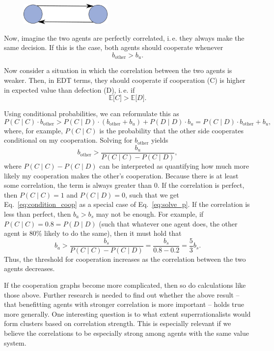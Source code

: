 \begin{figure}
    \centering
    \includegraphics[width=1.78in]{figs/mutual-cooperation-graph}
\end{figure}

Now, imagine the two agents are perfectly correlated, i.\,e. they always
make the same decision. If this is the case, both agents should
cooperate whenever
\begin{equation}
    b_{\text{other}} > b_{u}.
    \label{eq:condition_coop}
\end{equation}

Now consider a situation in which the correlation between the two agents
is weaker. Then, in EDT terms, they should cooperate if cooperation (C)
is higher in expected value than defection (D), i.\,e. if
$$
\mathbb{E}\lbrack C\rbrack > \mathbb{E}\lbrack D\rbrack.
$$

Using conditional probabilities, we can reformulate this as
$$
P(C\mid C) \cdot b_{\text{other}} > P(C\mid D) \cdot (b_{\text{other}} + b_{u}) + P(D\mid D) \cdot b_{u} =
P(C\mid D) \cdot b_{\text{other}} + b_{u},
$$
where, for example, \(P(C\mid C)\) is the probability that the other side
cooperates conditional on my cooperation. Solving for \(b_{\text{other}}\) yields
\begin{equation}
    b_{\text{other}} > \frac{b_{u}}{P(C\mid C) - P(C\mid D)},
    \label{eq:solve_p}
\end{equation}
where \(P(C\mid C) - P(C\mid D)\) can be interpreted as quantifying how much
more likely my cooperation makes the other's cooperation. Because there
is at least some correlation, the term is always greater than 0. If the
correlation is perfect, then \(P(C\mid C) = 1\) and \(P(C\mid D) = 0\), such
that we get Eq.~\eqref{eq:condition_coop} as a special case of Eq.~\eqref{eq:solve_p}. If the correlation is less
than perfect, then \(b_{a} > b_{s}\) may not be enough. For example, if
\(P(C\mid C) = 0.8 = P(D\mid D)\) (such that whatever one agent does, the other
agent is 80\% likely to do the same), then it must hold that
$$
b_{a} > \frac{b_{s}}{P(C\mid C) - P(C\mid D)} = \frac{b_{s}}{0.8 - 0.2} = \frac{5}{3}b_{s}.
$$
Thus, the threshold for cooperation increases as the correlation between
the two agents decreases.

If the cooperation graphs become more complicated, then so do
calculations like those above. Further research is needed to find out
whether the above result -- that benefitting agents with stronger
correlation is more important -- holds true more generally. One
interesting question is to what extent superrationalists would form
clusters based on correlation strength. This is especially relevant if
we believe the correlations to be especially strong among agents with
the same value system.

